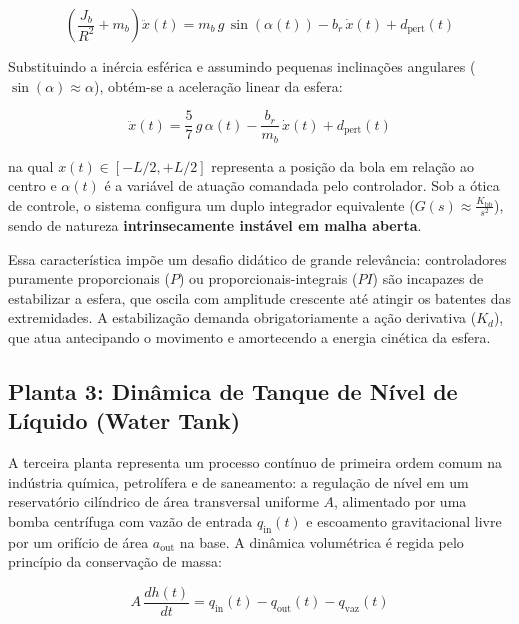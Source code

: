 \begin{equation}
    \left( \frac{J_b}{R^2} + m_b \right) \ddot{x}(t) = m_b \, g \, \sin(\alpha(t)) - b_r \, \dot{x}(t) + d_{\text{pert}}(t)
    \label{eq:dinamica_ball_beam}
\end{equation}

Substituindo a inércia esférica e assumindo pequenas inclinações angulares ($\sin(\alpha) \approx \alpha$), obtém-se a aceleração linear da esfera:

\begin{equation}
    \ddot{x}(t) = \frac{5}{7} \, g \, \alpha(t) - \frac{b_r}{m_b} \, \dot{x}(t) + d_{\text{pert}}(t)
    \label{eq:aceleracao_ball_beam}
\end{equation}

\noindent na qual $x(t) \in [-L/2, +L/2]$ representa a posição da bola em relação ao centro e $\alpha(t)$ é a variável de atuação comandada pelo controlador. Sob a ótica de controle, o sistema configura um duplo integrador equivalente ($G(s) \approx \frac{K_{\text{bb}}}{s^2}$), sendo de natureza \textbf{intrinsecamente instável em malha aberta}. 

Essa característica impõe um desafio didático de grande relevância: controladores puramente proporcionais ($P$) ou proporcionais-integrais ($PI$) são incapazes de estabilizar a esfera, que oscila com amplitude crescente até atingir os batentes das extremidades. A estabilização demanda obrigatoriamente a ação derivativa ($K_d$), que atua antecipando o movimento e amortecendo a energia cinética da esfera.

\subsection{Planta 3: Dinâmica de Tanque de Nível de Líquido (Water Tank)}
\label{subsec:planta_tanque}

A terceira planta representa um processo contínuo de primeira ordem comum na indústria química, petrolífera e de saneamento: a regulação de nível em um reservatório cilíndrico de área transversal uniforme $A$, alimentado por uma bomba centrífuga com vazão de entrada $q_{\text{in}}(t)$ e escoamento gravitacional livre por um orifício de área $a_{\text{out}}$ na base. A dinâmica volumétrica é regida pelo princípio da conservação de massa:

\begin{equation}
    A \, \frac{dh(t)}{dt} = q_{\text{in}}(t) - q_{\text{out}}(t) - q_{\text{vaz}}(t)
    \label{eq:balanco_massa_tanque}
\end{equation}

